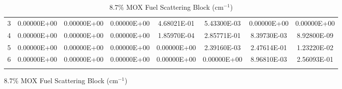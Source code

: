 \begin{figure}
\begin{table}[H]
\begin{subtable}[h]{1.0\textwidth}
{\begin{tabular}{*8c}
3 &	0.00000E+00 &	0.00000E+00 &	0.00000E+00	& 4.68021E-01	& 5.43300E-03	& 0.00000E+00	& 0.00000E+00 \\
4 &	0.00000E+00 &	0.00000E+00 &	0.00000E+00	& 1.85970E-04	& 2.85771E-01	& 8.39730E-03	& 8.92800E-09 \\
5 &	0.00000E+00 &	0.00000E+00 &	0.00000E+00	& 0.00000E+00	& 2.39160E-03	& 2.47614E-01	& 1.23220E-02 \\
6 &	0.00000E+00 &	0.00000E+00 &	0.00000E+00	& 0.00000E+00	& 0.00000E+00	& 8.96810E-03	& 2.56093E-01 \\
        \bottomrule
        & & & & & & & 
    \end{tabular}}
        \caption{8.7\% MOX Fuel Scattering Block (cm$^{-1}$)}
  \end{subtable}
\end{table}
\end{figure}

